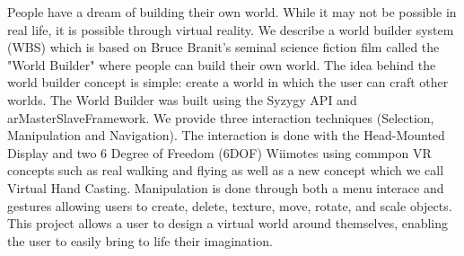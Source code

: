 People have a dream of building their own world. While it may not be possible in real life, it is possible through virtual reality.
We describe a world builder system (WBS) which is based on Bruce Branit's seminal science fiction film called the "World Builder" where people can build their own world.
The idea behind the world builder concept is simple: create a world in which the user can craft other worlds.
The World Builder was built using the Syzygy API and arMasterSlaveFramework.
We provide three interaction techniques (Selection, Manipulation and Navigation).
The interaction is done with the Head-Mounted Display and two 6 Degree of Freedom (6DOF) Wiimotes using commpon VR concepts such as real walking and flying as well as a new concept which we call Virtual Hand Casting.
Manipulation is done through both a menu interace and gestures allowing users to create, delete, texture, move, rotate, and scale objects.
This project allows a user to design a virtual world around themselves, enabling the user to easily bring to life their imagination.
